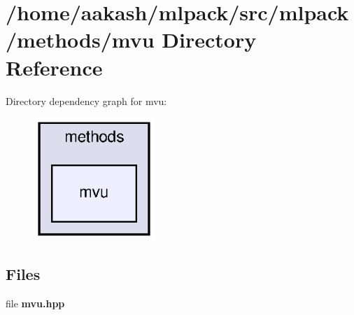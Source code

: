 \section{/home/aakash/mlpack/src/mlpack/methods/mvu Directory Reference}
\label{dir_9eb99e0b60764b3853507c6f78b4dfdc}
Directory dependency graph for mvu\+:
\nopagebreak
\begin{figure}[H]
\begin{center}
\leavevmode
\includegraphics[width=130pt]{dir_9eb99e0b60764b3853507c6f78b4dfdc_dep}
\end{center}
\end{figure}
\subsection*{Files}
\begin{DoxyCompactItemize}
\item 
file \textbf{ mvu.\+hpp}
\end{DoxyCompactItemize}
